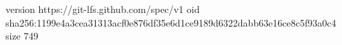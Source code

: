 version https://git-lfs.github.com/spec/v1
oid sha256:1199e4a3cea31313acf0e876df35e6d1ce9189d6322dabb63e16ce8c5f93a0c4
size 749
